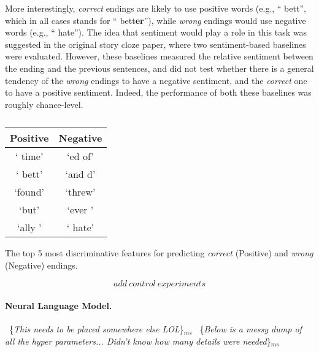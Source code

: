 \documentclass[11pt,a4paper]{article}
\newcommand{\ms}[1]{{\color{cyan}\{\textit{#1}\}$_{ms}$}}
\newcommand{\roy}[1]{\footnote{\color{red}{\textbf{Roy: #1}}}}
\begin{document}
More interestingly, {\it correct} endings are likely to use positive words (e.g., `` bett'', which in all cases stands for `` bett{\bf er}''), while  {\it wrong} endings would use negative words (e.g., `` hate''). 
The idea that  sentiment would play a role in this task was suggested in the original story cloze paper, where two sentiment-based baselines were evaluated. 
However, these baselines measured the relative sentiment between the ending and the previous sentences, and did not test whether there is a general tendency of the {\it wrong} endings to have a negative sentiment, and the {\it correct} one to have a positive sentiment.
Indeed, the performance of both these baselines was roughly chance-level.


\begin{table}[!t]
\begin{center}
\begin{tabular}{|c|c|} \hline
{\bf Positive} & {\bf Negative}\\ \hline
` time' & `ed of'\\ \hline
` bett' & `and d'\\ \hline
`found' & `threw'\\ \hline
`but' & `ever '\\ \hline
`ally ' & ` hate'\\ \hline

\end{tabular}
\end{center}
\caption{\label{features}}
The top 5 most discriminative features for predicting {\it correct} (Positive)  and {\it wrong} (Negative) endings.\end{table}

\[add\ control\ experiments\]

\paragraph{Neural Language Model.}
~\ms{This needs to be placed somewhere else LOL}
~\ms{Below is a messy dump of all the hyper parameters... Didn't know how many details were needed}
\end{document}
